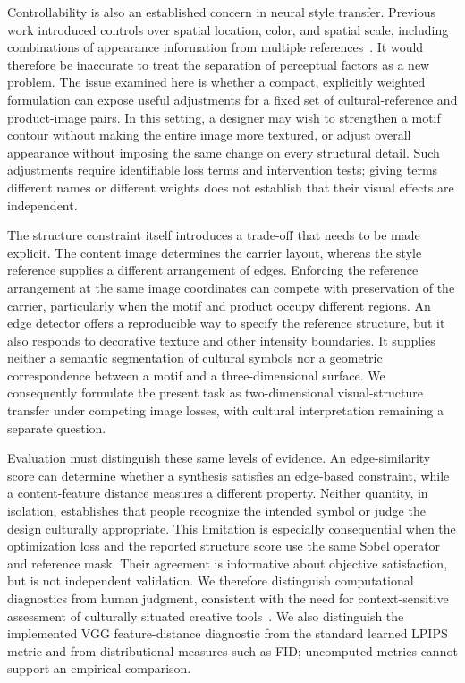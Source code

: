 \documentclass[manuscript,acmlarge,screen,review]{acmart}
\begin{document}
Controllability is also an established concern in neural style transfer. Previous work introduced controls over spatial location, color, and spatial scale, including combinations of appearance information from multiple references~\cite{gatys2017control}. It would therefore be inaccurate to treat the separation of perceptual factors as a new problem. The issue examined here is whether a compact, explicitly weighted formulation can expose useful adjustments for a fixed set of cultural-reference and product-image pairs. In this setting, a designer may wish to strengthen a motif contour without making the entire image more textured, or adjust overall appearance without imposing the same change on every structural detail. Such adjustments require identifiable loss terms and intervention tests; giving terms different names or different weights does not establish that their visual effects are independent.

The structure constraint itself introduces a trade-off that needs to be made explicit. The content image determines the carrier layout, whereas the style reference supplies a different arrangement of edges. Enforcing the reference arrangement at the same image coordinates can compete with preservation of the carrier, particularly when the motif and product occupy different regions. An edge detector offers a reproducible way to specify the reference structure, but it also responds to decorative texture and other intensity boundaries. It supplies neither a semantic segmentation of cultural symbols nor a geometric correspondence between a motif and a three-dimensional surface. We consequently formulate the present task as two-dimensional visual-structure transfer under competing image losses, with cultural interpretation remaining a separate question.

Evaluation must distinguish these same levels of evidence. An edge-similarity score can determine whether a synthesis satisfies an edge-based constraint, while a content-feature distance measures a different property. Neither quantity, in isolation, establishes that people recognize the intended symbol or judge the design culturally appropriate. This limitation is especially consequential when the optimization loss and the reported structure score use the same Sobel operator and reference mask. Their agreement is informative about objective satisfaction, but is not independent validation. We therefore distinguish computational diagnostics from human judgment, consistent with the need for context-sensitive assessment of culturally situated creative tools~\cite{qadri2024}. We also distinguish the implemented VGG feature-distance diagnostic from the standard learned LPIPS metric and from distributional measures such as FID; uncomputed metrics cannot support an empirical comparison.
\end{document}
